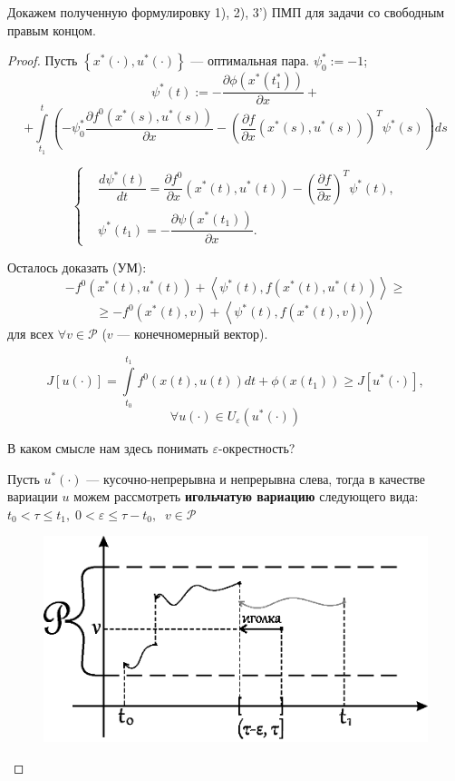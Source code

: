 \documentclass[12pt, a4paper]{article}
\theoremstyle{rusdef}
\newcommand\scalar[1]{\left < #1 \right >} %
\renewcommand{\P}{\mathscr{P}} %
\renewcommand{\d}{\partial} %
\begin{document}
Докажем полученную формулировку 1), 2), 3') ПМП для задачи со свободным правым концом.
\begin{proof}
Пусть $\left\{ x^*(\cdot), u^*(\cdot) \right\}$ --- оптимальная пара. $\psi^*_0 := -1$;
$$
\psi^*(t) := -\dfrac{\d \phi(x^*(t_1^*))}{\d x} +
$$
$$
+ \int\limits_{t_1}^{t} \left( -\psi^*_0 \dfrac{\d f^0(x^*(s), u^*(s))}{\d x} - \left( \dfrac{\d f}{\d x}(x^*(s), u^*(s)) \right)^T \psi^*(s) \right) ds
$$

$$
\left\{
\begin{aligned}
& \dfrac{d \psi^*(t)}{dt} = \dfrac{\d f^0}{\d x}(x^*(t), u^*(t)) - \left( \dfrac{\d f}{\d x} \right)^T \psi^*(t), \\
& \psi^*(t_1) = - \dfrac{\d \psi(x^*(t_1))}{\d x}.
\end{aligned}
\right.
$$

Осталось доказать (УМ):
$$
- f^0 (x^*(t), u^*(t)) + \scalar{\psi^*(t), f(x^*(t), u^*(t))} \geqslant
$$
$$
\geqslant -f^0 (x^*(t), v) + \scalar{\psi^*(t), f(x^*(t), v))}
$$
для всех $\forall v \in \P$ ($v$ --- конечномерный вектор).

$$
J[u(\cdot)] = \int\limits_{t_0}^{t_1} f^0(x(t), u(t)) dt + \phi(x(t_1)) \geqslant J[u^*(\cdot)],
$$
$$
\forall u(\cdot) \in U_{\varepsilon}(u^*(\cdot))
$$

В каком смысле нам здесь понимать $\varepsilon$-окрестность?

Пусть  $u^*(\cdot)$ --- кусочно-непрерывна и непрерывна слева, тогда в качестве вариации $u$ можем рассмотреть \textbf{игольчатую вариацию} следующего вида:\\
$t_0 < \tau \leqslant t_1, \; 0 < \varepsilon \leqslant \tau - t_0, \;\; v \in \P$

\begin{figure}[h!]
\includegraphics[scale=0.7]{niddle.eps}
\end{figure}


\end{proof}
\end{document}
